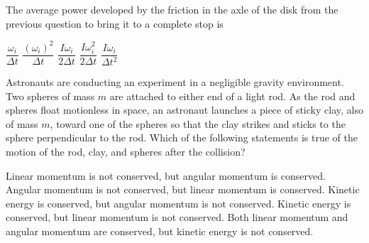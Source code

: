 \documentclass{../../../oss-classkick-exam}
\begin{document}
\begin{multicols*}{2}
\begin{questions}
  \question The average power developed by the friction in the axle of the disk
    from the previous question to bring it to a complete stop is
    \begin{choices}
      \choice $\dfrac{\omega_i}{\Delta t}$
      \choice $\dfrac{(\omega_i)^2}{\Delta t}$
      \choice $\dfrac{I\omega_i}{2\Delta t}$
      \choice $\dfrac{I\omega_i^2}{2\Delta t}$
      \choice $\dfrac{I\omega_i}{\Delta t^2}$
    \end{choices}    

    \question Astronauts are conducting an experiment in a negligible gravity
    environment. Two spheres of mass $m$ are attached to either end of a light
    rod. As the rod and spheres float motionless in space, an astronaut
    launches a piece of sticky clay, also of mass $m$, toward one of the spheres
    so that the clay strikes and sticks to the sphere perpendicular to the rod.
    Which of the following statements is true of the motion of the rod, clay,
    and spheres after the collision?
    \begin{center}
    \end{center}
    \begin{choices}
      \choice Linear momentum is not conserved, but angular momentum is
      conserved.
      \choice Angular momentum is not conserved, but linear momentum is
      conserved.
      \choice Kinetic energy is conserved, but angular momentum is not
      conserved.
      \choice Kinetic energy is conserved, but linear momentum is not conserved.
      \choice Both linear momentum and angular momentum are conserved, but
      kinetic energy is not conserved.
    \end{choices}
    \vspace{.7in}
    

\end{questions}
\end{multicols*}
\end{document}
